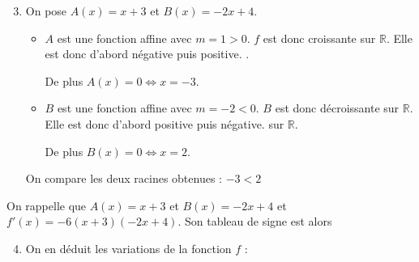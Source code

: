 \documentclass[15pt, mathserif]{beamer}
\begin{document}
 \begin{frame} 
 
 \begin{enumerate} 
 \setcounter{enumi}{2} 
 
 	 \item On pose $A(x)= x+3$ et $B(x) = -2x+4$.
 \bigskip 
 \begin{itemize}
	\item $A$ est une fonction affine avec $m =1>0$. $f$ est donc croissante sur $\mathbb{R}$. Elle est donc d'abord négative puis positive. .

	 De plus $A(x) = 0 \Leftrightarrow x = -3$. 
 \bigskip 
	\item $B$ est une fonction affine avec $m =-2<0$. $B$ est donc décroissante sur $\mathbb{R}$. Elle est donc d'abord positive puis négative. sur $\mathbb{R}$.

	 De plus $B(x) = 0 \Leftrightarrow x = 2$.
\end{itemize}
 On compare les deux racines obtenues : $ -3 < 2$ 
 \end{enumerate} 
 
 \end{frame}


\begin{frame}On rappelle que $A(x) = x+3$ et $B(x) = -2x+4$ et $f'(x) = -6(x+3)(-2x+4)$. Son tableau de signe est alors 

\medskip \hfil
{}

 \begin{enumerate} 
 \setcounter{enumi}{3} 
 	 \item On en déduit les variations de la fonction $f$ : 

  \medskip \hfil
{}

 \end{enumerate} 
 
\end{frame}
\end{document}
